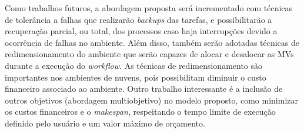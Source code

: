 Como trabalhos futuros, a abordagem proposta será incrementado com técnicas de tolerância a falhas que  realizarão \textit{backups} das tarefas, e possibilitarão a recuperação parcial, ou total, dos processos caso haja interrupções devido a ocorrência de falhas no ambiente. Além disso, também serão adotadas técnicas de redimensionamento do ambiente que serão capazes de alocar e desalocar as MVs durante a execução do \textit{workflow}. As técnicas de redimensionamento são importantes nos ambientes de nuvens, pois possibilitam diminuir o custo financeiro associado ao ambiente. Outro trabalho interessante é a inclusão de outros objetivos (abordagem multiobjetivo) no modelo proposto, como minimizar os custos financeiros e o \textit{makespan}, respeitando o tempo limite de execução definido pelo usuário e um valor máximo de orçamento. 




